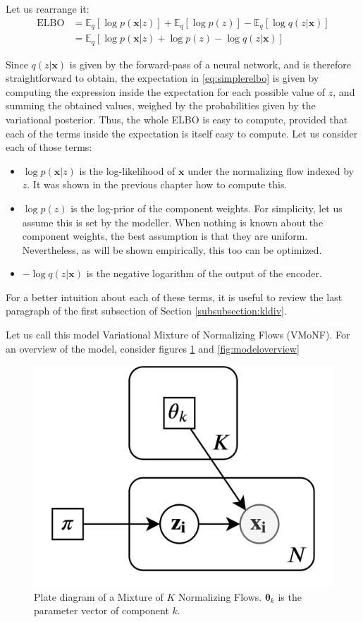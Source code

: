 Let us rearrange it:
\begin{align}
    \text{ELBO} &= \mathbb{E}_q [\log p(\bm{x}|z)] + \mathbb{E}_q [\log p(z)] - \mathbb{E}_q [\log q(z|\bm{x})]
        \label{eq:threepartelbo} \\
    &= \mathbb{E}_q [\log p(\bm{x}|z) + \log p(z) - \log q(z|\bm{x})] \label{eq:simplerelbo}
\end{align}

Since $q(z|\bm{x})$ is given by the forward-pass of a neural network, and is therefore
straightforward to obtain, the expectation in \ref{eq:simplerelbo} is given by
computing the expression inside the expectation for each possible value of $z$,
and summing the obtained values, weighed by the probabilities given by the variational posterior.
Thus, the whole ELBO is easy to compute, provided that each of the terms inside
the expectation is itself easy to compute. Let us consider each of those terms:
\begin{itemize}
    \item $\log p(\bm{x}|z)$ is the log-likelihood of $\bm{x}$ under the normalizing
        flow indexed by $z$. It was shown in the previous chapter how to compute
        this.
    \item $\log p(z)$ is the log-prior of the component weights. For simplicity,
        let us assume this is set by the modeller. When nothing is known about
        the component weights, the best assumption is that they are uniform.
        Nevertheless, as will be shown empirically, this too can be optimized.
    \item $- \log q(z|\bm{x})$ is the negative logarithm of the output of the encoder.
\end{itemize}

For a better intuition about each of these terms, it is useful to review the last
paragraph of the first subsection of Section \ref{subsubsection:kldiv}.

Let us call this model Variational Mixture of Normalizing Flows (VMoNF). For an overview of
the model, consider figures \ref{fig:plate} and \ref{fig:modeloverview}

\begin{figure}[!htb]
  \centering
  \includegraphics[width=0.5\linewidth]{figures/plate_diagram.png}
  \caption{Plate diagram of a Mixture of $K$ Normalizing Flows. $\bm\theta_k$ is the
    parameter vector of component $k$.}
  \label{fig:plate}
\end{figure}

